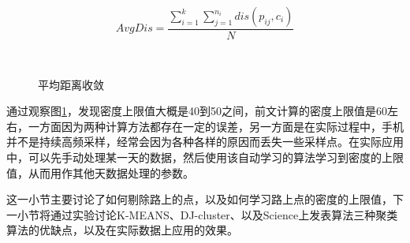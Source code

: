 \begin{equation}
\label{equ:chap3:avgdis_01}
AvgDis=\frac{\sum_{i=1}^{k}\sum_{j=1}^{n_{i}}dis(p_{ij},c_{i})}{N}
\end{equation}
\begin{figure}[htb]
  \centering%
  \\
  \caption{平均距离收敛}
  \label{fig:3_7}
\end{figure}
\par 通过观察图\ref{fig:3_7}，发现密度上限值大概是40到50之间，前文计算的密度上限值是60左右，一方面因为两种计算方法都存在一定的误差，另一方面是在实际过程中，手机并不是持续高频采样，经常会因为各种各样的原因而丢失一些采样点。在实际应用中，可以先手动处理某一天的数据，然后使用该自动学习的算法学习到密度的上限值，从而用作其他天数据处理的参数。
\par 这一小节主要讨论了如何剔除路上的点，以及如何学习路上点的密度的上限值，下一小节将通过实验讨论K-MEANS、DJ-cluster、以及Science上发表算法三种聚类算法的优缺点，以及在实际数据上应用的效果。
